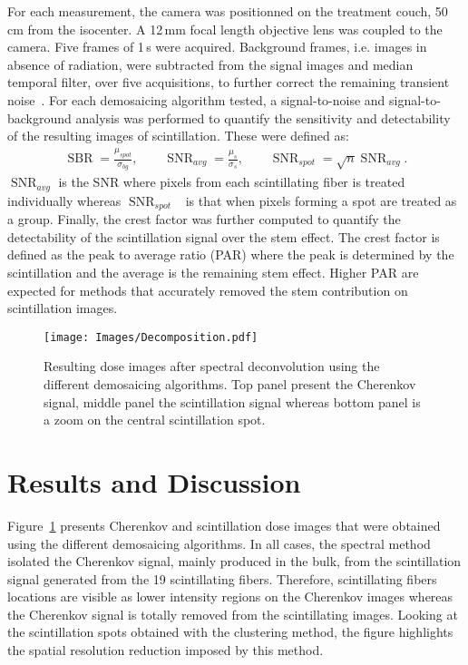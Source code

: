 \documentclass[12pt]{iopart}
\DeclareMathOperator{\SBR}{SBR}
\DeclareMathOperator{\SNR}{SNR}
\begin{document}
For each measurement, the camera was positionned on the treatment couch, 50 cm from the isocenter. A 12\,mm focal length objective lens was coupled to the camera. Five frames of 1\,s were acquired. Background frames, i.e. images in absence of radiation, were subtracted from the signal images and median temporal filter, over five acquisitions, to further correct the remaining transient noise~\cite{archambault_transient_2008}. For each demosaicing algorithm tested, a signal-to-noise and signal-to-background analysis was performed to quantify the sensitivity and detectability of the resulting images of scintillation. These were defined as:
\begin{align}
   \SBR = \frac{\mu_{spot}}{\sigma_{bg}}, \qquad \SNR_{avg} = \frac{\mu_{s}}{\sigma_{s}}, \qquad \SNR_{spot}= \sqrt{n}\SNR_{avg}.
\end{align}
$\SNR_{avg}$ is the SNR where pixels from each scintillating fiber is treated individually whereas $\SNR_{spot}$~\cite{lacroix_design_2009} is that when pixels forming a spot are treated as a group. Finally, the crest factor was further computed to quantify the detectability of the scintillation signal over the stem effect. The crest factor is defined as the peak to average ratio (PAR) where the peak is determined by the scintillation and the average is the remaining stem effect. Higher PAR are expected for methods that accurately removed the stem contribution on scintillation images.
\begin{figure}[ht]
    \centering
    \texttt{[image: Images/Decomposition.pdf]}
    \caption{Resulting dose images after spectral deconvolution using the different demosaicing algorithms. Top panel present the Cherenkov signal, middle panel the scintillation signal whereas bottom panel is a zoom on the central scintillation spot.}
    \label{fig:pixel_demosaicing}
\end{figure}
\section{Results and Discussion}

Figure~\ref{fig:pixel_demosaicing} presents Cherenkov and scintillation dose images that were obtained using the different demosaicing algorithms. In all cases, the spectral method isolated the Cherenkov signal, mainly produced in the bulk, from the scintillation signal generated from the 19 scintillating fibers. Therefore, scintillating fibers locations are visible as lower intensity regions on the Cherenkov images whereas the Cherenkov signal is totally removed from the scintillating images. Looking at the scintillation spots obtained with the clustering method, the figure highlights the spatial resolution reduction imposed by this method. 
\end{document}
